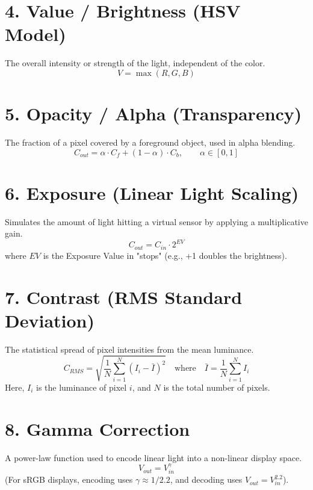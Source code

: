 \documentclass[UTF8]{ctexart}
\begin{document}
\section*{4. Value / Brightness (HSV Model)}
The overall intensity or strength of the light, independent of the color.
\begin{equation}
	V = \max(R, G, B)
\end{equation}

\section*{5. Opacity / Alpha (Transparency)}
The fraction of a pixel covered by a foreground object, used in alpha blending.
\begin{equation}
	C_{out} = \alpha \cdot C_f + (1 - \alpha) \cdot C_b, \qquad \alpha \in [0, 1]
\end{equation}

\section*{6. Exposure (Linear Light Scaling)}
Simulates the amount of light hitting a virtual sensor by applying a multiplicative gain.
\begin{equation}
	C_{out} = C_{in} \cdot 2^{EV}
\end{equation}
where $EV$ is the Exposure Value in "stops" (e.g., +1 doubles the brightness).

\section*{7. Contrast (RMS Standard Deviation)}
The statistical spread of pixel intensities from the mean luminance.
\begin{equation}
	C_{RMS} = \sqrt{ \frac{1}{N} \sum_{i=1}^{N} (I_i - \bar{I})^2 }
	\quad \text{where} \quad 
	\bar{I} = \frac{1}{N} \sum_{i=1}^{N} I_i
\end{equation}
Here, $I_i$ is the luminance of pixel $i$, and $N$ is the total number of pixels.

\section*{8. Gamma Correction}
A power-law function used to encode linear light into a non-linear display space.
\begin{equation}
	V_{out} = V_{in}^{\gamma}
\end{equation}
(For sRGB displays, encoding uses $\gamma \approx 1/2.2$, and decoding uses $V_{out} = V_{in}^{2.2}$).
\end{document}
